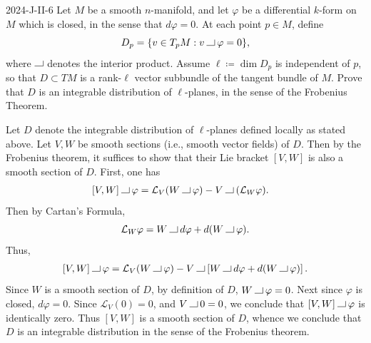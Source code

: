 \documentclass{article}
\newcommand{\contract}{\mathbin{\vrule height 0.4pt width 8pt depth 0pt\vrule height 6pt width 0.4pt depth 0pt}}
\begin{document}
	
	\begin{prb}{2024-J-II-6}
		Let $M$ be a smooth $n$-manifold, and let $\varphi$ be a differential $k$-form on $M$ which is closed, in the sense that $d\varphi = 0$. At each point $p \in M$, define 
		\begin{equation*}
			D_{p} = \{v \in T_{p}M: v\contract \varphi = 0\}, 
		\end{equation*}
		where $\contract$ denotes the interior product. Assume $\ell \coloneqq \dim{D_{p}}$ is independent of $p$, so that $D \subset TM$ is a rank-$\ell$ vector subbundle of the tangent bundle of $M$. Prove that $D$ is an integrable distribution of $\ell$-planes, in the sense of the Frobenius Theorem. 
	\end{prb}
	Let $D$ denote the integrable distribution of $\ell$-planes defined locally as stated above. Let $V, W$ be smooth sections (i.e., smooth vector fields) of $D$. Then by the Frobenius theorem, it suffices to show that their Lie bracket $[V, W]$ is also a smooth section of $D$. First, one has 
	\begin{align*}
		\begin{split}
			[V, W] \contract \varphi &= \mathcal{L}_{V}(W \contract \varphi) - V \contract (\mathcal{L}_{W}\varphi). 
		\end{split}
	\end{align*}
	Then by Cartan's Formula, 
	\begin{equation*}
		\mathcal{L}_{W}\varphi = W \contract d\varphi + d(W \contract \varphi). 
	\end{equation*}
	Thus, 
	\begin{align*}
		\begin{split}
			[V, W] \contract \varphi = \mathcal{L}_{V}(W \contract \varphi) - V \contract \left[W \contract d\varphi + d(W \contract \varphi)\right]. 
		\end{split}
	\end{align*}
	Since $W$ is a smooth section of $D$, by definition of $D$, $W \contract \varphi = 0$. Next since $\varphi$ is closed, $d\varphi = 0$. Since $\mathcal{L}_{V}(0) = 0$, and $V \contract 0 = 0$, we conclude that $[V, W] \contract \varphi$ is identically zero. Thus $[V, W]$ is a smooth section of $D$, whence we conclude that $D$ is an integrable distribution in the sense of the Frobenius theorem. 
	
\end{document}
